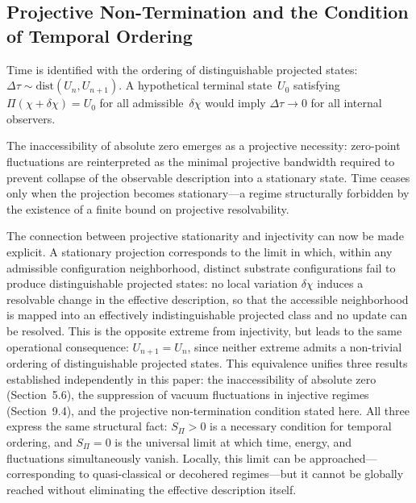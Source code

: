 \subsection{Projective Non-Termination and the Condition of Temporal Ordering}
  \label{subsec:projective-non-termination}

  Time is identified with the ordering of distinguishable projected
  states: $\Delta \tau \sim \mathrm{dist}(U_n, U_{n+1})$.
  A hypothetical terminal state~$U_0$ satisfying
  $\Pi(\chi + \delta\chi) = U_0$ for all admissible~$\delta\chi$ would
  imply $\Delta\tau \rightarrow 0$ for all internal observers.

  The inaccessibility of absolute zero emerges as a projective necessity:
  zero-point fluctuations are reinterpreted as the minimal projective
  bandwidth required to prevent collapse of the observable description into
  a stationary state.
  Time ceases only when the projection becomes stationary---a regime
  structurally forbidden by the existence of a finite bound on projective
  resolvability.

  The connection between projective stationarity and injectivity can now be made
  explicit.
  A stationary projection corresponds to the limit in which, within any admissible
  configuration neighborhood, distinct substrate configurations fail to produce
  distinguishable projected states: no local variation $\delta\chi$ induces a resolvable
  change in the effective description, so that the accessible neighborhood is mapped into an effectively
  indistinguishable projected class and no update can be resolved.
  This is the opposite extreme from injectivity, but leads to the same operational
  consequence: $U_{n+1} = U_n$, since neither extreme admits a non-trivial ordering of
  distinguishable projected states.
  This equivalence unifies three results established independently in this paper:
  the inaccessibility of absolute zero (Section~5.6), the suppression of vacuum
  fluctuations in injective regimes (Section~9.4), and the projective non-termination
  condition stated here.
  All three express the same structural fact: $S_\Pi > 0$ is a necessary condition
  for temporal ordering, and $S_\Pi = 0$ is the universal limit at which time, energy,
  and fluctuations simultaneously vanish.
  Locally, this limit can be approached---corresponding to quasi-classical or
  decohered regimes---but it cannot be globally reached without eliminating the
  effective description itself.
